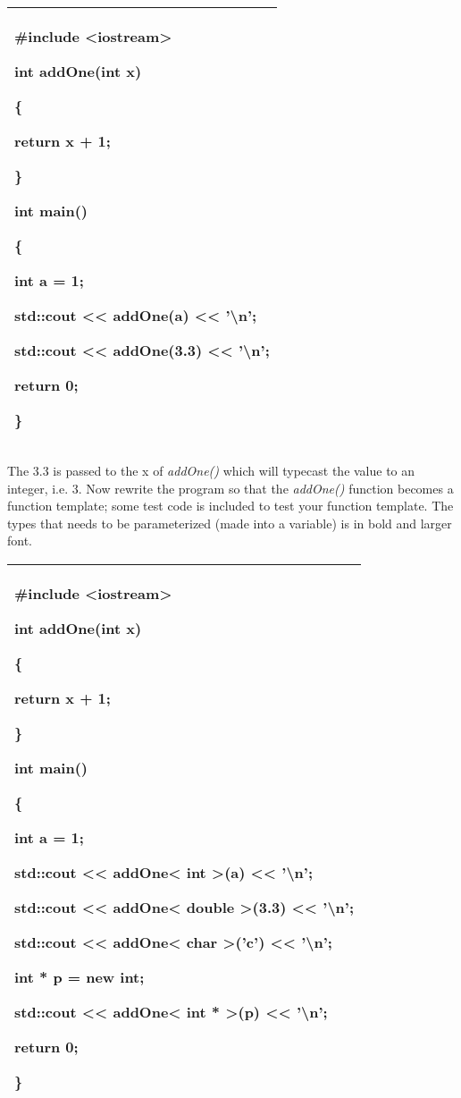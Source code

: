 \documentclass[
]{article}
\begin{document}
\begin{longtable}[]{@{}l@{}}
\toprule
\endhead
\begin{minipage}[t]{0.97\columnwidth}\raggedright
\#include \textless iostream\textgreater{}

int addOne(int x)

\{

return x + 1;

\}

int main()

\{

int a = 1;

std::cout \textless\textless{} addOne(a) \textless\textless{}
'\textbackslash n';

std::cout \textless\textless{} addOne(3.3) \textless\textless{}
'\textbackslash n';

return 0;

\}\strut
\end{minipage}\tabularnewline
\bottomrule
\end{longtable}

The 3.3 is passed to the x of \emph{addOne()} which will typecast the
value to an integer, i.e. 3. Now rewrite the program so that the
\emph{addOne()} function becomes a function template; some test code is
included to test your function template. The types that needs to be
parameterized (made into a variable) is in bold and larger font.

\begin{longtable}[]{@{}l@{}}
\toprule
\endhead
\begin{minipage}[t]{0.97\columnwidth}\raggedright
\#include \textless iostream\textgreater{}

\textbf{int} addOne(\textbf{int} x)

\{

return x + 1;

\}

int main()

\{

int a = 1;

std::cout \textless\textless{} addOne\textbf{\textless{} int
\textgreater{}}(a) \textless\textless{} '\textbackslash n';

std::cout \textless\textless{} addOne\textless{} double
\textgreater(3.3) \textless\textless{} '\textbackslash n';

std::cout \textless\textless{} addOne\textless{} char \textgreater('c')
\textless\textless{} '\textbackslash n';

int * p = new int;

std::cout \textless\textless{} addOne\textless{} int * \textgreater(p)
\textless\textless{} '\textbackslash n';

return 0;

\}\strut
\end{minipage}\tabularnewline
\bottomrule
\end{longtable}
\end{document}
